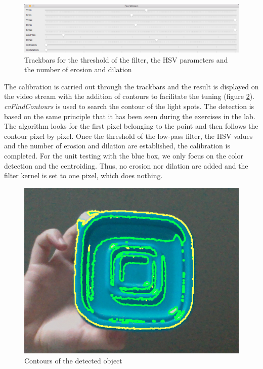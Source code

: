 \begin{figure}[H]
  \centering
  \includegraphics[scale=0.35]{fig/trackbars.png}
  \caption{Trackbars for the threshold of the filter, the HSV parameters and the number of erosion and dilation}
  \label{fig:trackbars}
\end{figure}

The calibration is carried out through the trackbars and the result is displayed on the video stream with the addition of contours to facilitate the tuning (figure \ref{fig:contours}). \textit{cvFindContours} is used to search the contour of the light spots. The detection is based on the same principle that it has been seen during the exercises in the lab. The algorithm looks for the first pixel belonging to the point and then follows the contour pixel by pixel. Once the threshold of the low-pass filter, the HSV values and the number of erosion and dilation are established, the calibration is completed. For the unit testing with the blue box, we only focus on the color detection and the centroiding. Thus, no erosion nor dilation are added and the filter kernel is set to one pixel, which does nothing. 

\begin{figure}[H]
  \centering
  \includegraphics[scale=0.6]{fig/contours.png}
  \caption{Contours of the detected object}
  \label{fig:contours}
\end{figure}

